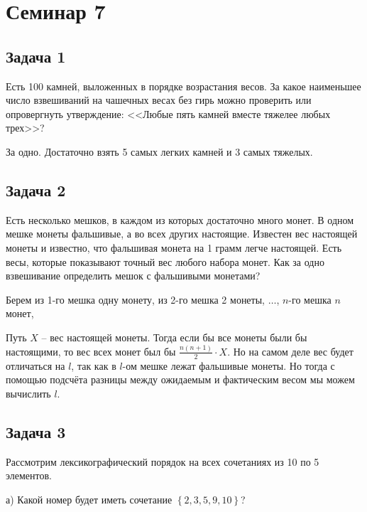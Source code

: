 
\section{Семинар 7}

\subsection{Задача 1}

Есть 100 камней, выложенных в порядке возрастания весов. За какое наименьшее
число взвешиваний на чашечных весах без гирь можно проверить или опровергнуть
утверждение: <<Любые пять камней вместе тяжелее любых трех>>?

\begin{solution*}
За одно. Достаточно взять 5 самых легких камней и 3 самых тяжелых.
\end{solution*}

\subsection{Задача 2}

Есть несколько мешков, в каждом из которых достаточно много монет. В одном мешке монеты фальшивые, а во всех других настоящие. Известен вес настоящей монеты
и известно, что фальшивая монета на 1 грамм легче настоящей. Есть весы, которые
показывают точный вес любого набора монет. Как за одно взвешивание определить
мешок с фальшивыми монетами?

\begin{solution*}
Берем из 1-го мешка одну монету, из 2-го мешка 2 монеты, $\ldots$, $n$-го мешка $n$ монет,

Путь $X$ -- вес настоящей монеты. Тогда если бы все монеты были бы настоящими, то вес всех монет был бы $\displaystyle \frac{n(n+1)}{2} \cdot X$. Но на самом деле вес будет отличаться на $l$, так как в $l$-ом мешке лежат фальшивые монеты. Но тогда с помощью подсчёта разницы между ожидаемым и фактическим весом мы можем вычислить $l$.
\end{solution*}

\subsection{Задача 3}

Рассмотрим лексикографический порядок на всех сочетаниях из 10 по 5 элементов.

а) Какой номер будет иметь сочетание $\left\{2,3,5,9,10\right\}$?

